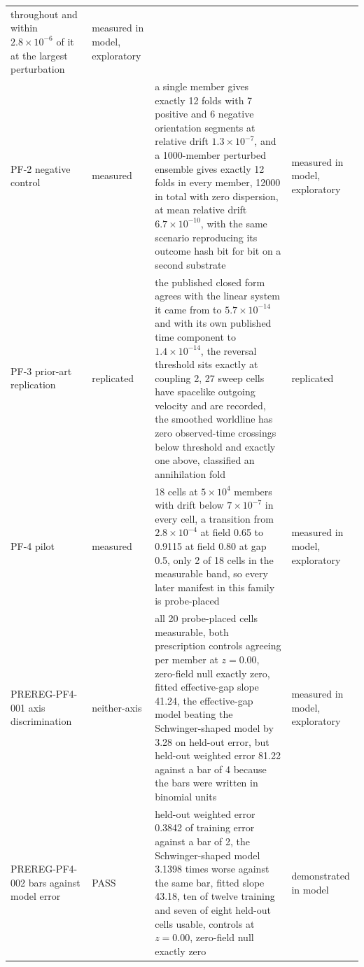 \documentclass[aps,pre,reprint,nofootinbib,floatfix]{revtex4-2}
\begin{document}
\begin{table}[t]
\begin{ruledtabular}
\begin{tabular}{L{2.5cm}lL{9.4cm}L{3.0cm}}
throughout and within $2.8\times10^{-6}$ of it at the largest
perturbation & measured in model, exploratory \\
PF-2 negative control & measured & a single member gives exactly 12
folds with 7 positive and 6 negative orientation segments at relative
drift $1.3\times10^{-7}$, and a 1000-member perturbed ensemble gives
exactly 12 folds in every member, 12000 in total with zero dispersion,
at mean relative drift $6.7\times10^{-10}$, with the same scenario
reproducing its outcome hash bit for bit on a second substrate &
measured in model, exploratory \\
PF-3 prior-art replication & replicated & the published closed form
agrees with the linear system it came from to $5.7\times10^{-14}$ and
with its own published time component to $1.4\times10^{-14}$, the
reversal threshold sits exactly at coupling 2, 27 sweep cells have
spacelike outgoing velocity and are recorded, the smoothed worldline
has zero observed-time crossings below threshold and exactly one above,
classified an annihilation fold & replicated \\
PF-4 pilot & measured & 18 cells at $5\times10^4$ members with drift
below $7\times10^{-7}$ in every cell, a transition from
$2.8\times10^{-4}$ at field 0.65 to 0.9115 at field 0.80 at gap 0.5,
only 2 of 18 cells in the measurable band, so every later manifest in
this family is probe-placed & measured in model, exploratory \\
PREREG-PF4-001 axis discrimination & neither-axis & all 20 probe-placed
cells measurable, both prescription controls agreeing per member at
$z=0.00$, zero-field null exactly zero, fitted effective-gap slope
41.24, the effective-gap model beating the Schwinger-shaped model by
3.28 on held-out error, but held-out weighted error 81.22 against a bar
of 4 because the bars were written in binomial units & measured in
model, exploratory \\
PREREG-PF4-002 bars against model error & PASS & held-out weighted
error 0.3842 of training error against a bar of 2, the Schwinger-shaped
model 3.1398 times worse against the same bar, fitted slope 43.18, ten
of twelve training and seven of eight held-out cells usable, controls
at $z=0.00$, zero-field null exactly zero & demonstrated in model \\
\end{tabular}
\end{ruledtabular}
\end{table}
\end{document}
